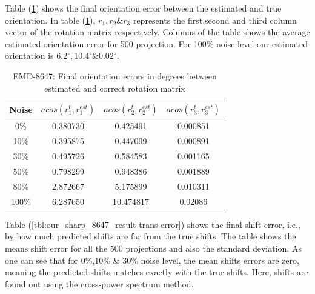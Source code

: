 \documentclass[twoside]{iitbreport}
\begin{document}
Table (\ref{tbl:our_sharp_8647_result-acos-rot}) shows the final orientation error between the estimated and true orientation. In table (\ref{tbl:our_sharp_8647_result-acos-rot}), $r_1,r_2 \& r_3$ represents the first,second and third column vector of the rotation matrix respectively. Columns of the table shows the average estimated orientation error for 500 projection. For 100\% noise level our estimated orientation is $6.2^\circ,10.4^\circ \& 0.02^\circ$. 

\begin{table}[H]
    \centering
     \begin{tabular}{||c c c c||} 
             \hline
             Noise 
             & $acos(r_1^{t},r_1^{est})$ 
             & $acos(r_2^{t},r_2^{est})$
             & $acos(r_3^{t},r_3^{est})$ 
             \\ 
            \hline\hline
            0\%   &0.380730&0.425491&0.000851 \\\hline
            10\%  &0.395875&0.447099&0.000891 \\\hline
            30\%  &0.495726&0.584583&0.001165 \\\hline
            50\%  &0.798299&0.948386&0.001889 \\\hline
            80\%  &2.872667&5.175899&0.010311 \\\hline
            100\% &6.287650&10.474817&0.02086 \\\hline
            \hline
    \end{tabular}
    \captionsetup{justification=centering}
    \caption{EMD-8647: Final orientation errors in degrees between estimated and correct rotation matrix}
    \label{tbl:our_sharp_8647_result-acos-rot}
\end{table}

Table (\ref{tbl:our_sharp_8647_result-trans-error}) shows the final shift error, i.e., by how much predicted shifts are far from the true shifts. The table shows the means shift error for all the 500 projections and also the standard deviation. As one can see that for 0\%,10\% \& 30\% noise level, the mean shifts errors are zero, meaning the predicted shifts matches exactly with the true shifts. Here, shifts are found out using the cross-power spectrum method. 
\end{document}
